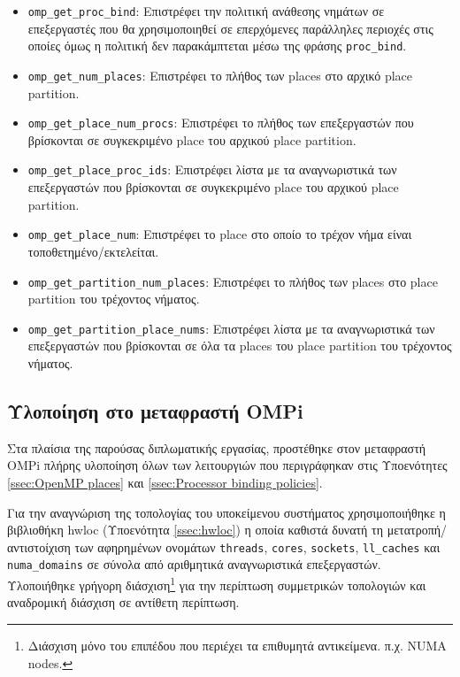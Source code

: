 \begin{itemize}
	\item \texttt{omp\_get\_proc\_bind}:	Επιστρέφει την πολιτική ανάθεσης νημάτων σε επεξεργαστές που θα χρησιμοποιηθεί σε επερχόμενες παράλληλες περιοχές στις οποίες όμως η πολιτική δεν παρακάμπτεται μέσω της φράσης \texttt{proc\_bind}.
	\item \texttt{omp\_get\_num\_places}: Επιστρέφει το πλήθος των places στο αρχικό place partition.
	\item \texttt{omp\_get\_place\_num\_procs}: Επιστρέφει το πλήθος των επεξεργαστών που βρίσκονται σε συγκεκριμένο place του αρχικού place partition.
	\item \texttt{omp\_get\_place\_proc\_ids}: Επιστρέφει λίστα με τα αναγνωριστικά των επεξεργαστών που βρίσκονται σε συγκεκριμένο place του αρχικού place partition.
	\item \texttt{omp\_get\_place\_num}: Επιστρέφει το place στο οποίο το τρέχον νήμα είναι τοποθετημένο/εκτελείται.
	\item \texttt{omp\_get\_partition\_num\_places}: Επιστρέφει το πλήθος των places στο place partition του τρέχοντος νήματος.
	\item \texttt{omp\_get\_partition\_place\_nums}: Επιστρέφει λίστα με τα αναγνωριστικά των επεξεργαστών που βρίσκονται σε όλα τα places του place partition του τρέχοντος νήματος.
\end{itemize}

\subsection{Υλοποίηση στο μεταφραστή OMPi}
Στα πλαίσια της παρούσας διπλωματικής εργασίας, προστέθηκε στον μεταφραστή OMPi πλήρης υλοποίηση όλων των λειτουργιών που περιγράφηκαν στις Υποενότητες \ref{ssec:OpenMP places} και \ref{ssec:Processor binding policies}.

Για την αναγνώριση της τοπολογίας του υποκείμενου συστήματος χρησιμοποιήθηκε η βιβλιοθήκη hwloc (Υποενότητα \ref{ssec:hwloc}) η οποία καθιστά δυνατή τη μετατροπή/αντιστοίχιση των αφηρημένων ονομάτων \texttt{threads}, \texttt{cores}, \texttt{sockets}, \texttt{ll\_caches} και \texttt{numa\_domains} σε σύνολα  από αριθμητικά αναγνωριστικά επεξεργαστών. Υλοποιήθηκε γρήγορη διάσχιση\footnote{Διάσχιση μόνο του επιπέδου που περιέχει τα επιθυμητά αντικείμενα. π.χ. NUMA nodes.} για την περίπτωση συμμετρικών τοπολογιών και αναδρομική διάσχιση σε αντίθετη περίπτωση.

